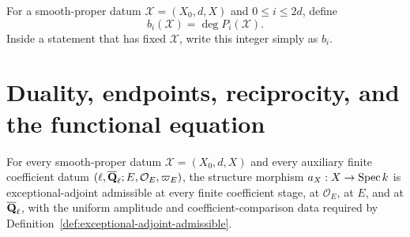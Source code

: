 
\begin{definition}
\label{def:betti-numbers}


For a smooth-proper datum \(\mathscr X=(X_0,d,X)\) and
\(0\leq i\leq2d\), define
\[
 b_i(\mathscr X)=\deg P_i(\mathscr X).
\]
Inside a statement that has fixed \(\mathscr X\), write this integer simply
as \(b_i\).
\end{definition}


\section{Duality, endpoints, reciprocity, and the functional equation}

\begin{theorem}
\label{thm:smooth-proper-structure-admissible}


For every smooth-proper datum \(\mathscr X=(X_0,d,X)\) and every auxiliary
finite coefficient datum
\((\ell,\overline{\mathbf Q}_\ell;E,\mathcal O_E,\varpi_E)\), the structure morphism
\(a_X:X\to\operatorname{Spec} k\) is exceptional-adjoint admissible at every finite
coefficient stage, at \(\mathcal O_E\), at \(E\), and at \(\overline{\mathbf Q}_\ell\), with the
uniform amplitude and coefficient-comparison data required by
Definition~\ref{def:exceptional-adjoint-admissible}.
\end{theorem}

